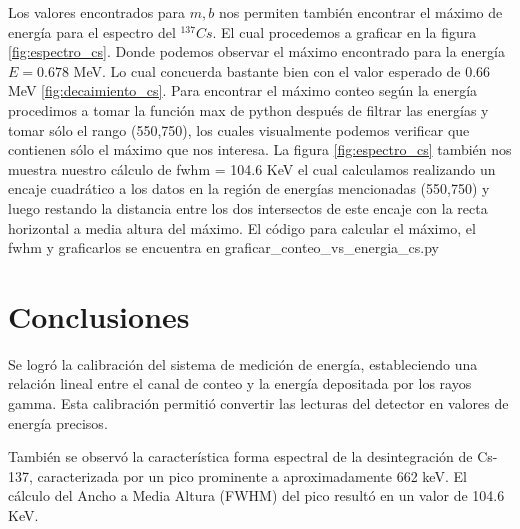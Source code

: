 \documentclass[twocolumn,a4paper,11pt]{scrartcl}
\begin{document}
Los valores encontrados para $m, b$ nos permiten también encontrar el máximo de energía para el espectro del $^{137}Cs$. El cual procedemos a graficar en la figura \ref{fig:espectro_cs}. Donde podemos observar el máximo encontrado para la energía $E= 0.678$ MeV. Lo cual concuerda bastante bien con el valor esperado de 0.66 MeV \ref{fig:decaimiento_cs}.
Para encontrar el máximo conteo según la energía procedimos a tomar la función max de python después de filtrar las energías y tomar sólo el rango (550,750), los cuales visualmente podemos verificar que contienen sólo el máximo que nos interesa.
La figura \ref{fig:espectro_cs} también nos muestra nuestro cálculo de fwhm = 104.6 KeV \cite{Martin2010} el cual calculamos realizando un encaje cuadrático a los datos en la región de energías mencionadas (550,750) y luego restando la distancia entre los dos intersectos de este encaje con la recta horizontal a media altura del máximo. El código para calcular el máximo, el fwhm y graficarlos se encuentra en graficar\_conteo\_vs\_energia\_cs.py

\section{Conclusiones}

Se logró la calibración del sistema de medición de energía, estableciendo una relación lineal entre el canal de conteo y la energía depositada por los rayos gamma. Esta calibración permitió convertir las lecturas del detector en valores de energía precisos.

También se observó la característica forma espectral de la desintegración de Cs-137, caracterizada por un pico prominente a aproximadamente 662 keV.  El cálculo del Ancho a Media Altura (FWHM) del pico resultó en un valor de 104.6 KeV.


 
\end{document}
